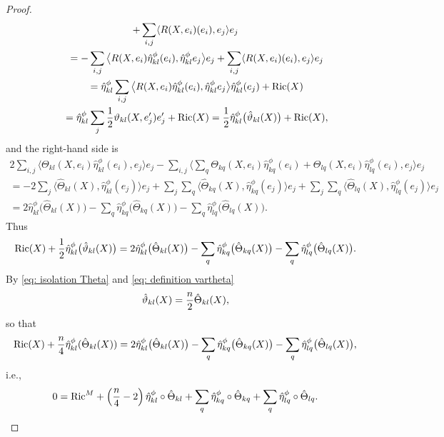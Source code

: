 \documentclass[pdftex]{sigma}
\numberwithin{equation}{section}
\begin{document}
\begin{proof}
\begin{gather*}
+\sum_{i,j}\langle {R(X,e_i)}(e_i),e_j\rangle e_j\\
\qquad{} =
-\sum_{i,j}\big\langle {R(X,e_i)}\hat{\eta}^\phi_{kl}(e_i),\hat{\eta}^\phi_{kl}e_j\big\rangle e_j +\sum_{i,j}\langle {R(X,e_i)}(e_i),e_j\rangle e_j\\
 \qquad{} =
\hat\eta_{kl}^\phi\sum_{i,j}\big\langle {R(X,e_i)}\hat{\eta}^\phi_{kl}(e_i),\hat{\eta}^\phi_{kl}e_j\big\rangle \hat\eta_{kl}^\phi (e_j)+{\rm Ric}(X)\\
\qquad{} = \hat\eta_{kl}^\phi\sum_{j}{1\over 2}\vartheta_{kl}(X,e_j')e_j'+{\rm Ric}(X)
 =
{1\over 2}\hat\eta_{kl}^\phi\big(\hat\vartheta_{kl}(X)\big)+{\rm Ric}(X) ,
\end{gather*}
and the right-hand side is
\begin{gather*}
 2\sum_{i,j}\big\langle \Theta_{kl}(X,e_i)\hat\eta_{kl}^\phi(e_i),e_j\big\rangle e_j
 -\sum_{i,j}\bigg\langle \sum_{q} \Theta_{kq}(X,e_i) \hat{\eta}^\phi_{kq}(e_i)
 + \Theta_{lq}(X,e_i)\hat{\eta}^\phi_{lq}(e_i),e_j\bigg\rangle e_j\\
{} =
- 2\sum_{j}\big\langle \hat\Theta_{kl}(X),\hat\eta_{kl}^\phi(e_j)\big\rangle e_j
 +\sum_{j}\sum_q\big\langle \hat\Theta_{kq}(X),\hat{\eta}^\phi_{kq}(e_j)\big\rangle e_j
 + \sum_{j}\sum_q\big\langle \hat\Theta_{lq}(X),\hat{\eta}^\phi_{lq}(e_j)\big\rangle e_j\\
{} = 2\hat\eta_{kl}^\phi\big(\hat\Theta_{kl}(X)\big) -\sum_q\hat{\eta}^\phi_{kq}\big(\hat\Theta_{kq}(X)\big)
 - \sum_q\hat{\eta}^\phi_{lq}\big(\hat\Theta_{lq}(X)\big).
\end{gather*}
Thus
\begin{gather*}
{\rm Ric}(X) +{1\over 2}\hat\eta_{kl}^\phi\big(\hat\vartheta_{kl}(X)\big) =
 2\hat\eta_{kl}^\phi\big(\hat\Theta_{kl}(X)\big) -\sum_q\hat{\eta}^\phi_{kq}\big(\hat\Theta_{kq}(X)\big)
 - \sum_q\hat{\eta}^\phi_{lq}\big(\hat\Theta_{lq}(X)\big).
\end{gather*}
By \eqref{eq: isolation Theta} and \eqref{eq: definition vartheta}
\begin{gather*}\hat\vartheta_{kl}(X)={n\over 2}\hat\Theta_{kl}(X),\end{gather*}
so that
\begin{gather*}
{\rm Ric}(X) +{n\over 4}\hat\eta_{kl}^\phi(\hat\Theta_{kl}(X)) =
 2\hat\eta_{kl}^\phi\big(\hat\Theta_{kl}(X)\big) -\sum_q\hat{\eta}^\phi_{kq}\big(\hat\Theta_{kq}(X)\big) - \sum_q\hat{\eta}^\phi_{lq}\big(\hat\Theta_{lq}(X)\big),
\end{gather*}
i.e.,
\begin{gather*}
 0={\rm Ric}^M + \left({n\over 4}-2\right)\hat\eta_{kl}^\phi\circ\hat\Theta_{kl} +\sum_q\hat{\eta}^\phi_{kq}\circ\hat\Theta_{kq} + \sum_q\hat{\eta}^\phi_{lq}\circ\hat\Theta_{lq}.

\end{gather*}
\end{proof}
\end{document}
